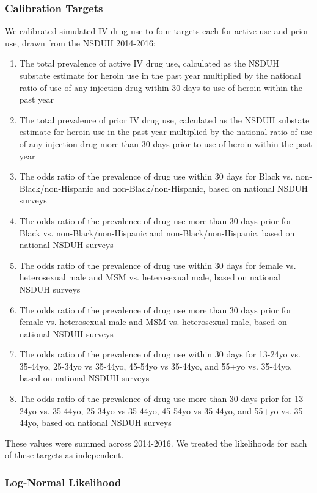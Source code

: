 \documentclass{article}
\begin{document}
\subsubsection{Calibration Targets}
We calibrated simulated IV drug use to four targets each for active use and prior use, drawn from the NSDUH 2014-2016\cite{nsduh}:
\begin{enumerate}
	\item The total prevalence of active IV drug use, calculated as the NSDUH substate estimate for heroin use in the past year multiplied by the national ratio of use of any injection drug within 30 days to use of heroin within the past year
	\item The total prevalence of prior IV drug use, calculated as the NSDUH substate estimate for heroin use in the past year multiplied by the national ratio of use of any injection drug more than 30 days prior to use of heroin within the past year
	\item The odds ratio of the prevalence of drug use within 30 days for Black vs. non-Black/non-Hispanic and non-Black/non-Hispanic, based on national NSDUH surveys
	\item The odds ratio of the prevalence of drug use more than 30 days prior for Black vs. non-Black/non-Hispanic and non-Black/non-Hispanic, based on national NSDUH surveys
	\item The odds ratio of the prevalence of drug use within 30 days for female vs. heterosexual male and MSM vs. heterosexual male, based on national NSDUH surveys
	\item The odds ratio of the prevalence of drug use more than 30 days prior for female vs. heterosexual male and MSM vs. heterosexual male, based on national NSDUH surveys
	\item The odds ratio of the prevalence of drug use within 30 days for 13-24yo vs. 35-44yo, 25-34yo vs 35-44yo, 45-54yo vs 35-44yo, and 55+yo vs. 35-44yo, based on national NSDUH surveys
	\item The odds ratio of the prevalence of drug use more than 30 days prior for 13-24yo vs. 35-44yo, 25-34yo vs 35-44yo, 45-54yo vs 35-44yo, and 55+yo vs. 35-44yo, based on national NSDUH surveys
\end{enumerate}

These values were summed across 2014-2016. We treated the likelihoods for each of these targets as independent.

\subsubsection{Log-Normal Likelihood}
\end{document}
